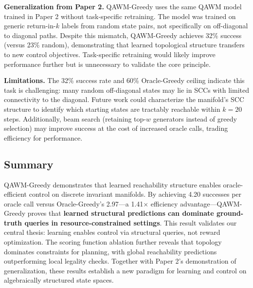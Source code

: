 \textbf{Generalization from Paper 2.} QAWM-Greedy uses the same QAWM model trained in Paper 2 without task-specific retraining. The model was trained on generic return-in-$k$ labels from random state pairs, not specifically on off-diagonal to diagonal paths. Despite this mismatch, QAWM-Greedy achieves 32\% success (versus 23\% random), demonstrating that learned topological structure transfers to new control objectives. Task-specific retraining would likely improve performance further but is unnecessary to validate the core principle.

\textbf{Limitations.} The 32\% success rate and 60\% Oracle-Greedy ceiling indicate this task is challenging: many random off-diagonal states may lie in SCCs with limited connectivity to the diagonal. Future work could characterize the manifold's SCC structure to identify which starting states are tractably reachable within $k=20$ steps. Additionally, beam search (retaining top-$w$ generators instead of greedy selection) may improve success at the cost of increased oracle calls, trading efficiency for performance.

\subsection{Summary}

QAWM-Greedy demonstrates that learned reachability structure enables oracle-efficient control on discrete invariant manifolds. By achieving 4.20 successes per oracle call versus Oracle-Greedy's 2.97—a 1.41$\times$ efficiency advantage—QAWM-Greedy proves that \textbf{learned structural predictions can dominate ground-truth queries in resource-constrained settings}. This result validates our central thesis: learning enables control via structural queries, not reward optimization. The scoring function ablation further reveals that topology dominates constraints for planning, with global reachability predictions outperforming local legality checks. Together with Paper 2's demonstration of generalization, these results establish a new paradigm for learning and control on algebraically structured state spaces.
